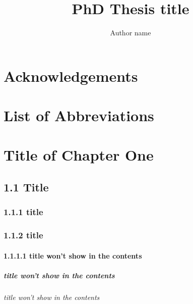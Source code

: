 \documentclass[a4paper, 11pt, UTF8, openright]{book}
\begin{document}
\title{PhD Thesis title}
\author{Author name}
\maketitle
\thispagestyle{empty}

\tableofcontents
\thispagestyle{empty}
\newpage
\thispagestyle{empty}
\frontmatter

\chapter*{Acknowledgements}
\lipsum[1-5]

\chapter*{List of Abbreviations}
\lipsum[1-5]

\mainmatter
\chapter{Title of Chapter One}
\lipsum[1-5]

\section{1.1 Title}
\lipsum[1-10]

\subsection{1.1.1 title}
\lipsum[1-5]

\subsection{1.1.2 title}
\lipsum[1-5]

\subsubsection{1.1.1.1 title won't show in the contents}
\lipsum[1-5]

\paragraph{title won't show in the contents}
\lipsum[1-5]

\subparagraph{title won't show in the contents}
\lipsum[1-5]
\end{document}
